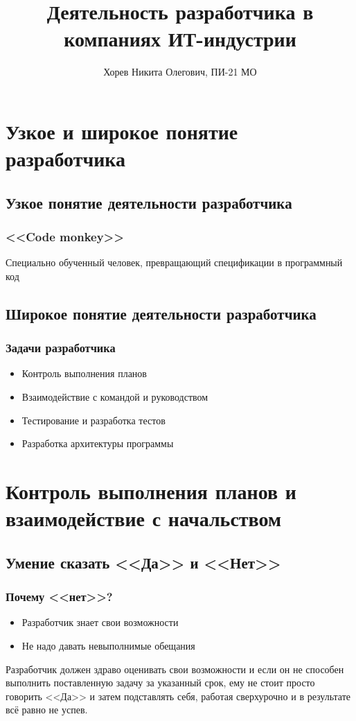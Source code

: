 \documentclass{../industrial-development}
\title{Деятельность разработчика в компаниях ИТ-индустрии}
\author{Хорев Никита Олегович, ПИ-21 МО}
\date{}
\begin{document}
\begin{frame}
  \titlepage
\end{frame}


\section{Узкое и широкое понятие разработчика}
\subsection{Узкое понятие деятельности разработчика}
\begin{frame} \frametitle{<<Code monkey>>}
Специально обученный человек, превращающий спецификации в программный код
\end{frame}
\lecturenotes

\subsection{Широкое понятие деятельности разработчика}
\begin{frame} \frametitle{Задачи разработчика}
  \begin{itemize}
  \item Контроль выполнения планов
	\item Взаимодействие с командой и руководством
	\item Тестирование и разработка тестов
	\item Разработка архитектуры программы
  \end{itemize}
\end{frame}
\lecturenotes

\section{Контроль выполнения планов и взаимодействие с начальством}
\subsection{Умение сказать <<Да>> и <<Нет>>}
\begin{frame} \frametitle{Почему <<нет>>?}
  \begin{itemize}
  \item Разработчик знает свои возможности
	\item Не надо давать невыполнимые обещания
  \end{itemize}
\end{frame}
\lecturenotes
Разработчик должен здраво оценивать свои возможности и если он не способен выполнить поставленную задачу за указанный срок, ему не стоит просто говорить <<Да>> и затем подставлять себя, работая сверхурочно и в результате всё равно не успев.
\end{document}
